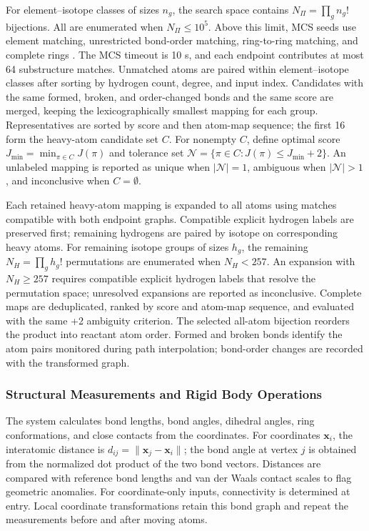 For element–isotope classes of sizes $n_g$, the search space contains $N_\Pi=\prod_g n_g!$ bijections. All are enumerated when $N_\Pi\le 10^5$. Above this limit, MCS seeds use element matching, unrestricted bond-order matching, ring-to-ring matching, and complete rings \citep{ref13}. The MCS timeout is 10 s, and each endpoint contributes at most 64 substructure matches. Unmatched atoms are paired within element–isotope classes after sorting by hydrogen count, degree, and input index. Candidates with the same formed, broken, and order-changed bonds and the same score are merged, keeping the lexicographically smallest mapping for each group. Representatives are sorted by score and then atom-map sequence; the first 16 form the heavy-atom candidate set $C$. For nonempty $C$, define optimal score $J_{\min}=\min_{\pi\in C}J(\pi)$ and tolerance set $\mathcal{N}=\{\pi\in C:J(\pi)\le J_{\min}+2\}$. An unlabeled mapping is reported as unique when $|\mathcal{N}|=1$, ambiguous when $|\mathcal{N}|>1$, and inconclusive when $C=\emptyset$.

Each retained heavy-atom mapping is expanded to all atoms using matches compatible with both endpoint graphs. Compatible explicit hydrogen labels are preserved first; remaining hydrogens are paired by isotope on corresponding heavy atoms. For remaining isotope groups of sizes $h_g$, the remaining $N_H=\prod_g h_g!$ permutations are enumerated when $N_H<257$. An expansion with $N_H\ge 257$ requires compatible explicit hydrogen labels that resolve the permutation space; unresolved expansions are reported as inconclusive. Complete maps are deduplicated, ranked by score and atom-map sequence, and evaluated with the same +2 ambiguity criterion. The selected all-atom bijection reorders the product into reactant atom order. Formed and broken bonds identify the atom pairs monitored during path interpolation; bond-order changes are recorded with the transformed graph.

\subsubsection{Structural Measurements and Rigid Body Operations}
The system calculates bond lengths, bond angles, dihedral angles, ring conformations, and close contacts from the coordinates. For coordinates $\mathbf{x}_i$, the interatomic distance is $d_{ij}=\|\mathbf{x}_j-\mathbf{x}_i\|$; the bond angle at vertex $j$ is obtained from the normalized dot product of the two bond vectors. Distances are compared with reference bond lengths and van der Waals contact scales to flag geometric anomalies. For coordinate-only inputs, connectivity is determined at entry. Local coordinate transformations retain this bond graph and repeat the measurements before and after moving atoms.

